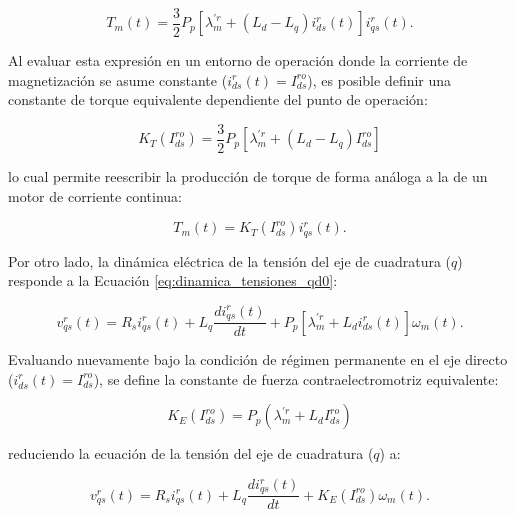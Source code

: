 \documentclass[10pt,a4paper]{article}
\begin{document}
\begin{equation*}
	T_m(t)=
	\frac{3}{2}P_p
	\left[
	\lambda_m^{\prime r}+\left(L_d-L_q\right)i_{ds}^{r}(t)
	\right]
	i_{qs}^{r}(t).
\end{equation*}

Al evaluar esta expresión en un entorno de operación donde la corriente de magnetización se asume constante ($i_{ds}^{r}(t)=I_{ds}^{ro}$), 
es posible definir una constante de torque equivalente dependiente del punto de operación:

\begin{equation}
    \boxed{
        K_T(I_{ds}^{ro})=
        \frac{3}{2}P_p
        \left[
        \lambda_m^{\prime r}+\left(L_d-L_q\right)I_{ds}^{ro}
        \right]
    }
    \label{eq:kt_variable_p2}
\end{equation}

lo cual permite reescribir la producción de torque de forma análoga a la de un motor de corriente continua:

\begin{equation}
    T_m(t)=K_T(I_{ds}^{ro})i_{qs}^{r}(t).
	\label{eq:torque_equivalente_f_K_T}
\end{equation}

Por otro lado, la dinámica eléctrica de la tensión del eje de cuadratura ($q$) responde a la Ecuación \eqref{eq:dinamica_tensiones_qd0}:

\begin{equation*}
	v_{qs}^{r}(t)=
	R_s i_{qs}^{r}(t)
	+
	L_q\frac{di_{qs}^{r}(t)}{dt}
	+
	P_p
	\left[
	\lambda_m^{\prime r}+L_d i_{ds}^{r}(t)
	\right]\omega_m(t).
	\label{eq:vq_ke_id}
\end{equation*}

Evaluando nuevamente bajo la condición de régimen permanente en el eje directo ($i_{ds}^{r}(t)=I_{ds}^{ro}$), 
se define la constante de fuerza contraelectromotriz equivalente:

\begin{equation}
    \boxed{
        K_E(I_{ds}^{ro})=
        P_p
        \left(
        \lambda_m^{\prime r}+L_d I_{ds}^{ro}
        \right)
    }
    \label{eq:ke_variable_p2}
\end{equation}

reduciendo la ecuación de la tensión del eje de cuadratura  ($q$) a:

\begin{equation}
    v_{qs}^{r}(t)=
    R_s i_{qs}^{r}(t)
    +
    L_q\frac{di_{qs}^{r}(t)}{dt}
    +
    K_E(I_{ds}^{ro})\omega_m(t).
	\label{eq:tension_q_equivalente_f_K_E}
\end{equation}
\end{document}
